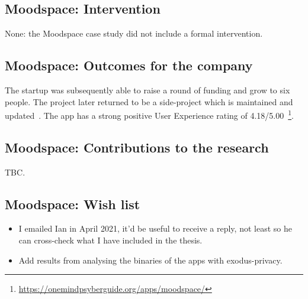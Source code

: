\subsection{Moodspace: Intervention}
None: the Moodspace case study did not include a formal intervention.

\subsection{Moodspace: Outcomes for the company}
The startup was subsequently able to raise a round of funding and grow to six people. The project later returned to be a side-project which is maintained and updated~\citep{alexander2021_linkedin_profile}. %
The app has a strong positive User Experience rating of 4.18/5.00~\footnote{\url{https://onemindpsyberguide.org/apps/moodspace/}}.



\subsection{Moodspace: Contributions to the research}
TBC.

\subsection*{Moodspace: Wish list}
{\small
\begin{itemize}
    \item I emailed Ian in April 2021, it'd be useful to receive a reply, not least so he can cross-check what I have included in the thesis.
    \item Add results from analysing the binaries of the apps with exodus-privacy.
\end{itemize}
}

\clearpage


